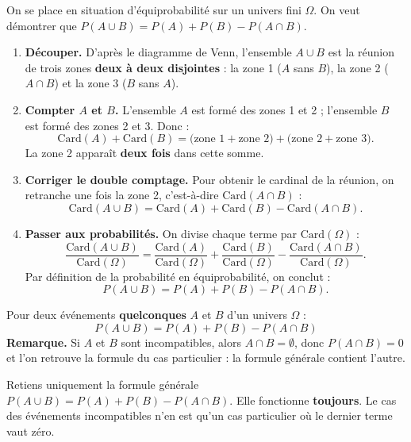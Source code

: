 \documentclass[11pt]{article}
\newcommand{\cle}[1]{{\popxbold\color{popdark}#1}}
\begin{document}
\begin{experience}
On se place en situation d'\cle{équiprobabilité} sur un univers fini $\Omega$. On veut démontrer que $P(A \cup B) = P(A) + P(B) - P(A \cap B)$.
\begin{enumerate}
\item \textbf{Découper.} D'après le diagramme de Venn, l'ensemble $A \cup B$ est la réunion de trois zones \textbf{deux à deux disjointes} : la zone 1 ($A$ sans $B$), la zone 2 ($A \cap B$) et la zone 3 ($B$ sans $A$).
\item \textbf{Compter $A$ et $B$.} L'ensemble $A$ est formé des zones 1 et 2 ; l'ensemble $B$ est formé des zones 2 et 3. Donc :
\[ \mathrm{Card}(A) + \mathrm{Card}(B) = \big(\text{zone 1} + \text{zone 2}\big) + \big(\text{zone 2} + \text{zone 3}\big). \]
La zone 2 apparaît \textbf{deux fois} dans cette somme.
\item \textbf{Corriger le double comptage.} Pour obtenir le cardinal de la réunion, on retranche une fois la zone 2, c'est-à-dire $\mathrm{Card}(A \cap B)$ :
\[ \mathrm{Card}(A \cup B) = \mathrm{Card}(A) + \mathrm{Card}(B) - \mathrm{Card}(A \cap B). \]
\item \textbf{Passer aux probabilités.} On divise chaque terme par $\mathrm{Card}(\Omega)$ :
\[ \frac{\mathrm{Card}(A \cup B)}{\mathrm{Card}(\Omega)} = \frac{\mathrm{Card}(A)}{\mathrm{Card}(\Omega)} + \frac{\mathrm{Card}(B)}{\mathrm{Card}(\Omega)} - \frac{\mathrm{Card}(A \cap B)}{\mathrm{Card}(\Omega)}. \]
Par définition de la probabilité en équiprobabilité, on conclut :
\[ P(A \cup B) = P(A) + P(B) - P(A \cap B). \]
\end{enumerate}
\end{experience}

\begin{propriete}
Pour deux événements \textbf{quelconques} $A$ et $B$ d'un univers $\Omega$ :
\[ \boxed{P(A \cup B) = P(A) + P(B) - P(A \cap B)} \]
\textbf{Remarque.} Si $A$ et $B$ sont incompatibles, alors $A \cap B = \emptyset$, donc $P(A \cap B) = 0$ et l'on retrouve la formule du cas particulier : la formule générale contient l'autre.
\end{propriete}

\begin{aretenir}
Retiens uniquement la formule générale $P(A \cup B) = P(A) + P(B) - P(A \cap B)$. Elle fonctionne \textbf{toujours}. Le cas des événements incompatibles n'en est qu'un cas particulier où le dernier terme vaut zéro.
\end{aretenir}
\end{document}
